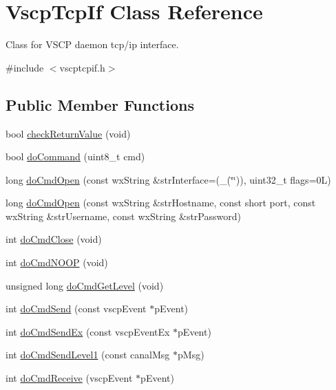 \hypertarget{class_vscp_tcp_if}{
\section{VscpTcpIf Class Reference}
\label{de/d84/class_vscp_tcp_if}
}


Class for VSCP daemon tcp/ip interface.  




{\ttfamily \#include $<$vscptcpif.h$>$}

\subsection*{Public Member Functions}
\begin{DoxyCompactItemize}
\item 
bool \hyperlink{class_vscp_tcp_if_af3ec4432c20158e6b902e7c3f130dbb5}{checkReturnValue} (void)
\item 
bool \hyperlink{class_vscp_tcp_if_a30c8ea3ab44febe9201fac022ef430e1}{doCommand} (uint8\_\-t cmd)
\item 
long \hyperlink{class_vscp_tcp_if_a945663abfd0e266cf886df999ade2107}{doCmdOpen} (const wxString \&strInterface=(\_\-(\char`\"{}\char`\"{})), uint32\_\-t flags=0L)
\item 
long \hyperlink{class_vscp_tcp_if_a9cf40ca841915268cf4f7260636e288f}{doCmdOpen} (const wxString \&strHostname, const short port, const wxString \&strUsername, const wxString \&strPassword)
\item 
int \hyperlink{class_vscp_tcp_if_a8508e6c901500c0a96dffd627a58127f}{doCmdClose} (void)
\item 
int \hyperlink{class_vscp_tcp_if_a602c55791afdc8db3598d06a858bd07d}{doCmdNOOP} (void)
\item 
unsigned long \hyperlink{class_vscp_tcp_if_a8273a1037a6ede0a2e7ea71cd0b1d30f}{doCmdGetLevel} (void)
\item 
int \hyperlink{class_vscp_tcp_if_a01be8e33fc4b6ec9ff0cc192e116b70d}{doCmdSend} (const vscpEvent $\ast$pEvent)
\item 
int \hyperlink{class_vscp_tcp_if_a8bfbe99df9f563b77417549dd98a3e09}{doCmdSendEx} (const vscpEventEx $\ast$pEvent)
\item 
int \hyperlink{class_vscp_tcp_if_a98357a25f5d64eb82f1beef36b4b7b3a}{doCmdSendLevel1} (const canalMsg $\ast$pMsg)
\item 
int \hyperlink{class_vscp_tcp_if_a9041d94956f75f19f9889bd78809a930}{doCmdReceive} (vscpEvent $\ast$pEvent)
\item 

\end{DoxyCompactItemize}
